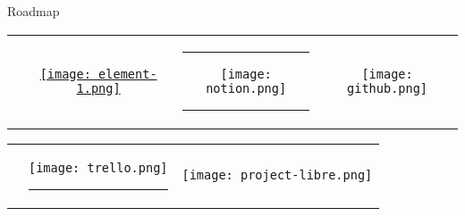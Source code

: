 \begin{frame}[c]{Roadmap}
    \begin{tabular}{cccc}
        \rule{30pt}{0ex}  &   \href{https://element.io/}{\texttt{[image: element-1.png]}} & \rule{15pt}{0ex} \texttt{[image: notion.png]} \rule{15pt}{0ex}& \texttt{[image: github.png]}\\
    \end{tabular}

    \begin{tabular}{ccc}
        \phantom{This text s invisible} &   \texttt{[image: trello.png]} \rule{5pt}{0ex}& \texttt{[image: project-libre.png]} \\
    \end{tabular}
\end{frame}
